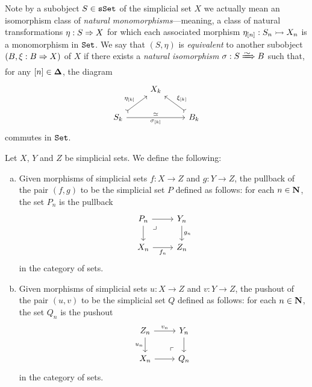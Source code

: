 \begin{remark}
    \label{rem:on-the-skeletal-filtration-of-a-sset}
    Note by a subobject \(S \in {\texttt{sSet}}\) of the simplicial set \(X\) we actually
    mean an isomorphism class of \emph{natural monomorphisms}---meaning, a class of
    natural transformations \(\eta: S \Rightarrow X\) for which each associated morphism
    \(\eta_{[n]}: S_n \rightarrowtail X_n\) is a monomorphism in \({\texttt{Set}}\). We say that
    \((S, \eta)\) is \emph{equivalent} to another subobject \((B, \xi: B \Rightarrow X)\)
    of \(X\) if there exists a \emph{natural isomorphism} \(\sigma: S \isonat B\)
    such that, for any \([n] \in {\mathbf{\Delta}}\), the diagram
    \[
        \begin{tikzcd}
            &X_k &
            \\
            S_k \ar[ru, tail, "\eta_{[k]}"]
            \ar[rr, "\dis", "\sigma_{[k]}"']
            &
            &B_k \ar[lu, tail, "\xi_{[k]}"']
        \end{tikzcd}
    \]
    commutes in \({\texttt{Set}}\).
\end{remark}

\begin{corollary}
    \label{cor:pushout-and-pullback-of-simplicial-sets}
    Let \(X\), \(Y\) and \(Z\) be simplicial sets. We define the following:
    \begin{enumerate}[(a)]\setlength\itemsep{0em}
        \item Given morphisms of simplicial sets \(f: X \to Z\) and \(g: Y \to Z\), the
              pullback of the pair \((f, g)\) to be the simplicial set \(P\) defined as
              follows: for each \(n \in \mathbf{N}\), the set \(P_n\) is the pullback
              \[
                  \begin{tikzcd}
                      P_n \ar[rd, phantom, "\lrcorner", very near start]
                      \ar[r] \ar[d]
                      &Y_n \ar[d, "g_n"] \\
                      X_n \ar[r, "f_n"']
                      &Z_n
                  \end{tikzcd}
              \]
              in the category of sets.
        \item Given morphisms of simplicial sets \(u: X \to Z\) and \(v: Y \to Z\), the
              pushout of the pair \((u, v)\) to be the simplicial set \(Q\) defined as
              follows: for each \(n \in \mathbf{N}\), the set \(Q_n\) is the pushout
              \[
                  \begin{tikzcd}
                      Z_n \ar[rd, phantom, "\ulcorner", very near end]
                      \ar[r, "v_n"] \ar[d, "u_n"']
                      &Y_n \ar[d] \\
                      X_n \ar[r]
                      &Q_n
                  \end{tikzcd}
              \]
              in the category of sets.
    \end{enumerate}
\end{corollary}

